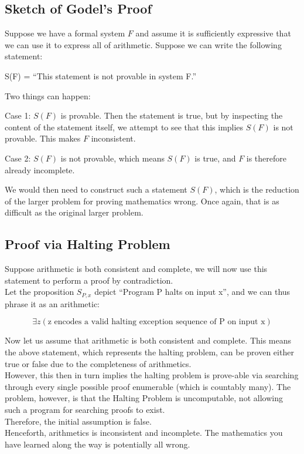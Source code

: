 \subsection{Sketch of Godel's Proof}
Suppose we have a formal system $F$ and assume it is sufficiently expressive that we can use it to express all of arithmetic. Suppose we can write the following statement:
\begin{center}
    S(F) = ``This statement is not provable in system F.''
\end{center}
Two things can happen:
\begin{bindenum}
    \item {
        Case 1: $S(F)$ is provable. Then the statement is true, but by inspecting the content of the statement itself, we attempt to see that this implies $S(F)$ is not provable. This makes $F$ inconsistent.
    }
    \item {
        Case 2: $S(F)$ is not provable, which means $S(F)$ is true, and $F$ is therefore already incomplete.
    }
\end{bindenum}
We would then need to construct such a statement $S(F)$, which is the reduction of the larger problem for proving mathematics wrong. Once again, that is as difficult as the original larger problem.

\subsection{Proof via Halting Problem}
Suppose arithmetic is both consistent and complete, we will now use this statement to perform a proof by contradiction. \\
Let the proposition $S_{P,x}$ depict ``Program P halts on input x'', and we can thus phrase it as an arithmetic:
\begin{center}
    \[\exists z (\text{z encodes a valid halting exception sequence of P on input x})\]
\end{center}
Now let us assume that arithmetic is both consistent and complete. This means the above statement, which represents the halting problem, can be proven either true or false due to the completeness of arithmetics. \\
However, this then in turn implies the halting problem is prove-able via searching through every single possible proof enumerable (which is countably many). The problem, however, is that the Halting Problem is uncomputable, not allowing such a program for searching proofs to exist. \\
Therefore, the initial assumption is false. \\
Henceforth, arithmetics is inconsistent and incomplete. The mathematics you have learned along the way is potentially all wrong.
